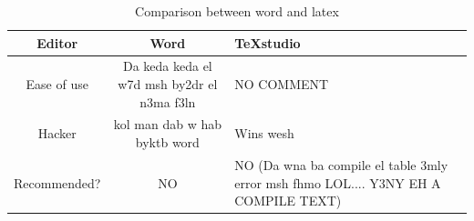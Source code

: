 \documentclass[a4paper,10pt]{article}
\begin{document}
	\begin{table}[H]
		\centering
		\caption{Comparison between word and latex}
		\begin{tabular}{|c|c||p{5cm}|}
			\hline
			Editor & Word & TeXstudio \\
			\hline
			Ease of use & Da keda keda el w7d msh by2dr el n3ma f3ln & NO COMMENT \\ \hline
			Hacker & kol man dab w hab byktb word & Wins wesh \\ \hline
			Recommended? & NO & NO (Da wna ba compile el table 3mly error msh fhmo LOL.... Y3NY EH A COMPILE TEXT) \\ 
			\hline
		\end{tabular}
	\end{table}
	
\end{document}
